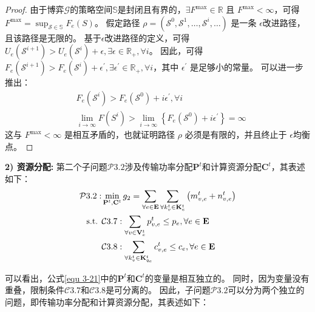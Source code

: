 \begin{proof}
由于博弈$\mathcal{G}$的策略空间$\mathbb{S}$是封闭且有界的，$\exists F^{\max} \in \mathbb{R}$ 且 $F^{\max} < \infty$，可得$F^{\max} = \sup _{\mathcal{S} \in \mathbb{S}} F_{e}(S)$。
假定路径 $\rho=\left(\mathcal{S}^{0}, \mathcal{S}^{1}, \ldots, \mathcal{S}^{i}, \ldots\right)$ 是一条 $\epsilon$改进路径，且该路径是无限的。
基于$\epsilon$改进路径的定义，可得$U_{e}\left(\mathcal{S}^{i+1}\right) > U_{e}\left(\mathcal{S}^{i}\right) + \epsilon, \exists \epsilon \in \mathbb{R}_{+}, \forall i$。
因此，可得$F_{e}\left(\mathcal{S}^{i+1}\right) > F_{e}\left(\mathcal{S}^{i}\right) + \epsilon^{\prime}, \exists \epsilon^{\prime} \in \mathbb{R}_{+}, \forall i$，其中 $\epsilon^{\prime}$ 是足够小的常量。
可以进一步推出：
\begin{align}
	&F_{e}\left(\mathcal{S}^{i}\right) > F_{e}\left(\mathcal{S}^{0}\right) + i   \epsilon^{\prime}, \forall i \\
	&\lim _{i \rightarrow \infty} F\left(S^{i}\right) > \lim _{i \rightarrow \infty} \left \{ F_{e}\left(\mathcal{S}^{0}\right) + i   \epsilon^{\prime} \right\} =\infty
\end{align}
这与 $F^{\max} < \infty$ 是相互矛盾的，也就证明路径 $\rho$ 必须是有限的，并且终止于 $\epsilon$均衡点。
\end{proof}

\textbf{2) 资源分配:} 第二个子问题$\mathcal{P}3.2$涉及传输功率分配$\mathbf{P}^{t}$和计算资源分配$\mathbf{C}^{t}$，其表述如下：
\begin{align}
	\mathcal{P}3.2: &\min_{\mathbf{P}^{t}, \mathbf{C}^{t}} g_2= \sum_{ \forall e \in \mathbf{E}} \sum_{\forall k_{v}^{t} \in \mathbf{K}_{e}^{t}} \left( m_{v, e}^{t} +  n_{v, e}^{t} \right) \notag \\
	\text { s.t. }
    &\mathcal{C}3.7: \sum_{\forall v \in \mathbf{V}_{e}^{t}} p_{v, e}^{t} \leq p_{e}, \forall e \in \mathbf{E} \notag \\
    &\mathcal{C}3.8: \sum_{\forall k_{v}^{t} \in {\mathbf{K}_{q_e}^{t} }} c_{v, e}^t \leq c_{e}, \forall e \in \mathbf{E}
\label{equ 3-21}
\end{align}

\noindent 可以看出，公式\ref{equ 3-21}中的$\mathbf{P}^{t}$和$\mathbf{C}^{t}$的变量是相互独立的。
同时，因为变量没有重叠，限制条件$\mathcal{C}3.7$和$\mathcal{C}3.8$是可分离的。
因此，子问题$\mathcal{P}3.2$可以分为两个独立的问题，即传输功率分配和计算资源分配，其表述如下：

